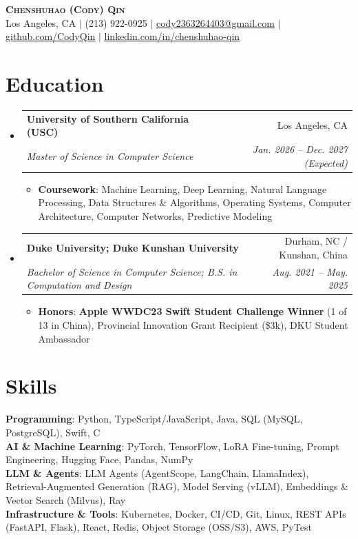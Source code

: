 \documentclass[letterpaper,10pt]{article}
\makeatletter
\newcommand{\resumeItem}[1]{
  \item\small{
    {#1}
  }
}
\newcommand{\resumeSubheading}[4]{
  \item
    \begin{tabular*}{0.97\textwidth}[t]{l@{\extracolsep{\fill}}r}
      \textbf{#1} & #2 \\
      \textit{\small#3} & \textit{\small #4} \\
    \end{tabular*}\vspace{-1pt}
}
\newcommand{\resumeSubHeadingListStart}{\begin{itemize}[leftmargin=0.15in, label={}, itemsep=2pt, topsep=2pt, parsep=0pt]}
\newcommand{\resumeSubHeadingListEnd}{\end{itemize}}
\newcommand{\resumeItemListStart}{\begin{itemize}[leftmargin=0.15in, itemsep=1pt, topsep=2pt, parsep=0pt]}
\newcommand{\resumeItemListEnd}{\end{itemize}\vspace{-3pt}}
\makeatother
\begin{document}
\begin{flushleft}
    \textbf{\Huge \scshape Chenshuhao (Cody) Qin} \\ \vspace{3pt}
    \small
    Los Angeles, CA $|$ (213) 922-0925 $|$
    \href{mailto:cody2363264403@gmail.com}{\underline{cody2363264403@gmail.com}} $|$
    \href{https://github.com/CodyQin}{\underline{github.com/CodyQin}} $|$
    \href{https://www.linkedin.com/in/chenshuhao-qin/}{\underline{linkedin.com/in/chenshuhao-qin}}
\end{flushleft}

\section{Education}
  \resumeSubHeadingListStart
    \resumeSubheading
      {University of Southern California (USC)}{Los Angeles, CA}
      {Master of Science in Computer Science}{Jan. 2026 -- Dec. 2027 (Expected)}
      \resumeItemListStart
        \resumeItem{\textbf{Coursework}: Machine Learning, Deep Learning, Natural Language Processing, Data Structures \& Algorithms, Operating Systems, Computer Architecture, Computer Networks, Predictive Modeling}
      \resumeItemListEnd
    \resumeSubheading
      {Duke University; Duke Kunshan University}{Durham, NC / Kunshan, China}
      {Bachelor of Science in Computer Science; B.S. in Computation and Design}{Aug. 2021 -- May. 2025}
      \resumeItemListStart
        \resumeItem{\textbf{Honors}: \textbf{Apple WWDC23 Swift Student Challenge Winner} (1 of 13 in China), Provincial Innovation Grant Recipient (\$3k), DKU Student Ambassador}
      \resumeItemListEnd
  \resumeSubHeadingListEnd

\section{Skills}
 \begin{itemize}[leftmargin=0.15in, label={}, itemsep=0pt, topsep=1pt, parsep=0pt]
    \small{\item{
     \textbf{Programming}{: Python, TypeScript/JavaScript, Java, SQL (MySQL, PostgreSQL), Swift, C} \\
     \textbf{AI \& Machine Learning}{: PyTorch, TensorFlow, LoRA Fine-tuning, Prompt Engineering, Hugging Face, Pandas, NumPy} \\
     \textbf{LLM \& Agents}{: LLM Agents (AgentScope, LangChain, LlamaIndex), Retrieval-Augmented Generation (RAG), Model Serving (vLLM), Embeddings \& Vector Search (Milvus), Ray} \\
     \textbf{Infrastructure \& Tools}{: Kubernetes, Docker, CI/CD, Git, Linux, REST APIs (FastAPI, Flask), React, Redis, Object Storage (OSS/S3), AWS, PyTest}
    }}
 \end{itemize}
\end{document}
